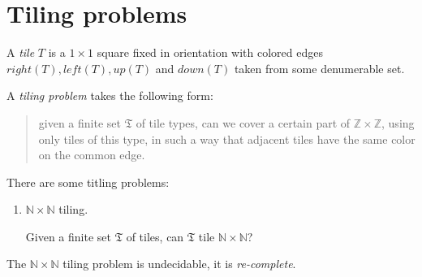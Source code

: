 \documentclass[a4paper,12pt,landscape]{article}
\begin{document}
\clearpage
\section{Tiling problems}

A \textit{tile} $T$ is a $1 \times 1$ square fixed in orientation with colored edges $right(T), left(T), up(T)$ and $down(T)$ taken from some denumerable set.


A \textit{tiling problem} takes the following form:
\begin{quotation}
    given a finite set $\mathfrak{T}$ of tile types, 
    can we cover a {\color{purple} certain part} of $\mathbb{Z} \times \mathbb{Z}$, 
    using only tiles of this type, 
    in such a way that adjacent tiles have the same color on the common edge.
\end{quotation}



\vspace{1.5em}


There are some titling problems:

\begin{enumerate}
    \item 
    $\mathbb{N} \times \mathbb{N}$ tiling. 

    Given a finite set $\mathfrak{T}$ of tiles, 
    can $\mathfrak{T}$ tile $\mathbb{N} \times \mathbb{N}$?
\end{enumerate}




    The $\mathbb{N} \times \mathbb{N}$ tiling problem is undecidable, 
    it is \textit{re-complete}.






\end{document}
